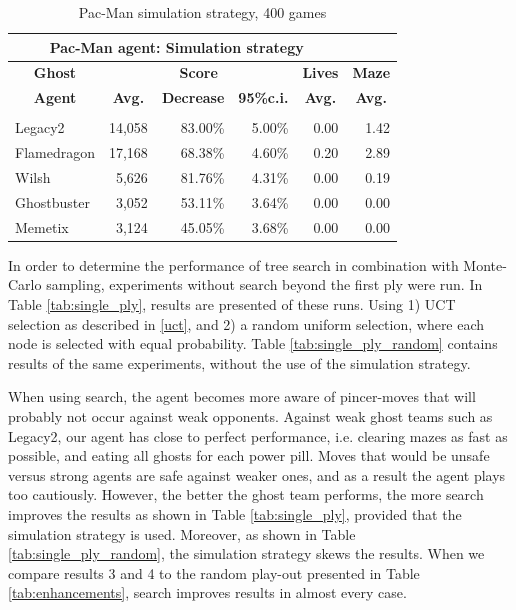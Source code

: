\documentclass[journal]{IEEEtran}
\begin{document}
\begin{table}[htp]
  \centering
  \caption{Pac-Man simulation strategy, 400 games}
    \begin{tabular}{lrrrrr}
    \toprule
    \multicolumn{5}{c}{\textbf{Pac-Man agent: Simulation strategy}} \\
    \midrule
\multicolumn{1}{c}{\textbf{Ghost}} & \multicolumn{3}{c}{\textbf{Score}} & \multicolumn{1}{c}{\textbf{Lives}} & \multicolumn{1}{c}{\textbf{Maze}} \\
    \multicolumn{1}{c}{\textbf{Agent}} & \multicolumn{1}{c}{\textbf{Avg.}} & \multicolumn{1}{c}{\textbf{Decrease}} & \multicolumn{1}{c}{\textbf{95\%c.i.}} & \multicolumn{1}{c}{\textbf{Avg.}} & \multicolumn{1}{c}{\textbf{Avg.}}
 \\ \noalign{\smallskip}
    \multicolumn{5}{l}{\textbf{No search}} \\ 
    {\sc Legacy2 } & 14,058 & 83.00\% & 5.00\% & 0.00  & 1.42 \\
    {\sc Flamedragon } & 17,168 & 68.38\% & 4.60\% & 0.20  & 2.89 \\
    {\sc Wilsh } & 5,626 & 81.76\% & 4.31\% & 0.00  & 0.19 \\
    {\sc Ghostbuster } & 3,052 & 53.11\% & 3.64\% & 0.00  & 0.00 \\
    {\sc Memetix } & 3,124 & 45.05\% & 3.68\% & 0.00  & 0.00 \\
    \bottomrule
    \end{tabular}%
  \label{tab:no_search}%
\end{table}%

In order to determine the performance of tree search in combination with Monte-Carlo sampling, experiments without search beyond the first ply were run. In Table \ref{tab:single_ply}, results are presented of these runs. Using 1) UCT selection as described in \ref{uct}, and 2) a random uniform selection, where each node is selected with equal probability. Table \ref{tab:single_ply_random} contains results of the same experiments, without the use of the simulation strategy.

When using search, the agent becomes more aware of pincer-moves that will probably not occur against weak opponents. Against weak ghost teams such as {\sc Legacy2}, our agent has close to perfect performance, i.e. clearing mazes as fast as possible, and eating all ghosts for each power pill. 
Moves that would be unsafe versus strong agents are safe against weaker ones, and as a result the agent plays too cautiously. However, the better the ghost team performs, the more search improves the results as shown in Table \ref{tab:single_ply}, provided that the simulation strategy is used.
Moreover, as shown in Table \ref{tab:single_ply_random}, the simulation strategy skews the results. When we compare results 3 and 4 to the random play-out presented in Table \ref{tab:enhancements}, search improves results in almost every case.
\end{document}
